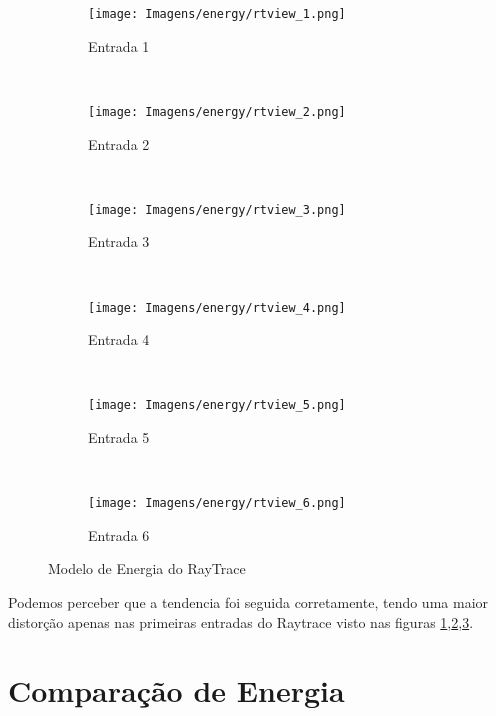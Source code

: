 \begin{figure}[H]
    \centering
    \begin{subfigure}[t]{0.5\textwidth}
        \centering
        \texttt{[image: Imagens/energy/rtview\_1.png]}
        \caption{Entrada 1}
	    \label{fig:energia_rtview_e1}
    \end{subfigure}%
    ~ 
    \begin{subfigure}[t]{0.5\textwidth}
        \centering
        \texttt{[image: Imagens/energy/rtview\_2.png]}
        \caption{Entrada 2}
        \label{fig:energia_rtview_e2}
    \end{subfigure}
    \\
    \centering
    \begin{subfigure}[t]{0.5\textwidth}
        \centering
        \texttt{[image: Imagens/energy/rtview\_3.png]}
        \caption{Entrada 3}
        \label{fig:energia_rtview_e3}
    \end{subfigure}%
    ~ 
    \begin{subfigure}[t]{0.5\textwidth}
        \centering
        \texttt{[image: Imagens/energy/rtview\_4.png]}
        \caption{Entrada 4}
        \label{fig:energia_rtview_e4}
    \end{subfigure}
    \\
    \centering
    \begin{subfigure}[t]{0.5\textwidth}
        \centering
        \texttt{[image: Imagens/energy/rtview\_5.png]}
        \caption{Entrada 5}
        \label{fig:energia_rtview_e5}
    \end{subfigure}%
    ~ 
    \begin{subfigure}[t]{0.5\textwidth}
        \centering
        \texttt{[image: Imagens/energy/rtview\_6.png]}
        \caption{Entrada 6}
        \label{fig:energia_rtview_e6}
    \end{subfigure}
    
    \caption{Modelo de Energia do RayTrace}
    \label{fig:energia_rtview}
\end{figure}


Podemos perceber que a tendencia foi seguida corretamente, tendo uma maior distorção apenas nas primeiras entradas do Raytrace visto nas figuras \ref{fig:energia_rtview_e1},\ref{fig:energia_rtview_e2},\ref{fig:energia_rtview_e3}.

\section{Comparação de Energia} \label{sec:comp}

